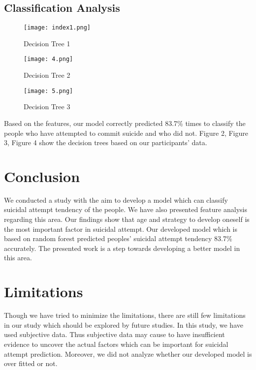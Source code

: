 \documentclass[conference]{IEEEtran}
\begin{document}
\subsection{Classification Analysis}

\begin{figure}[htbp]
\centerline{\texttt{[image: index1.png]}}
\caption{Decision Tree 1}
\label{fig_1}
\end{figure}

\begin{figure}[htbp]
\centerline{\texttt{[image: 4.png]}}
\caption{Decision Tree 2}
\label{fig_2}
\end{figure}

\begin{figure}[htbp]
\centerline{\texttt{[image: 5.png]}}
\caption{Decision Tree 3}
\label{fig_3}
\end{figure}

Based on the features, our model correctly predicted 83.7\% times to classify the people who have attempted to commit suicide and who did not. Figure 2, Figure 3, Figure 4 show the decision trees based on our participants’ data.

\section{Conclusion}

We conducted a study with the aim to develop a model which can classify suicidal attempt tendency of the people. We have also presented feature analysis regarding this area. Our findings show that age and strategy to develop oneself is the most important factor in suicidal attempt. Our developed model which is based on random forest predicted peoples’ suicidal attempt tendency 83.7\% accurately. The presented work is a step towards developing a better model in this area. 

\section{Limitations}

Though we have tried to minimize the limitations, there are still few limitations in our study which should be explored by future studies. In this study, we have used subjective data. Thus subjective data may cause to have insufficient evidence to uncover the actual factors which can be important for suicidal attempt prediction. Moreover, we did not analyze whether our developed model is over fitted or not.
\end{document}
